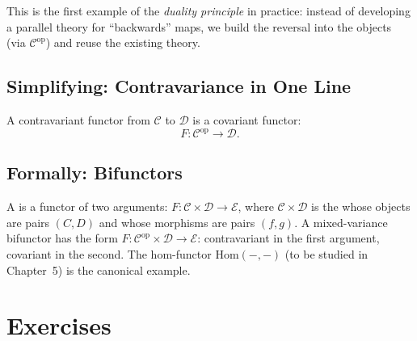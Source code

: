 This is the first example of the \emph{duality principle} in practice: instead
of developing a parallel theory for ``backwards'' maps, we build the reversal
into the objects (via $\mathcal{C}^{\mathrm{op}}$) and reuse the existing
theory.

\subsection{Simplifying: Contravariance in One Line}

A contravariant functor from $\mathcal{C}$ to $\mathcal{D}$ is a covariant
functor:
\[
  F : \mathcal{C}^{\mathrm{op}} \longrightarrow \mathcal{D}.
\]

\subsection{Formally: Bifunctors}

A  is a functor of two arguments: $F : \mathcal{C} \times
\mathcal{D} \to \mathcal{E}$, where $\mathcal{C} \times \mathcal{D}$ is
the  whose objects are pairs $(C, D)$ and whose
morphisms are pairs $(f, g)$. A mixed-variance bifunctor has the form
$F : \mathcal{C}^{\mathrm{op}} \times \mathcal{D} \to \mathcal{E}$:
contravariant in the first argument, covariant in the second. The
hom-functor $\mathrm{Hom}(-, -)$ (to be studied in Chapter~5) is the
canonical example.


\section*{Exercises}


